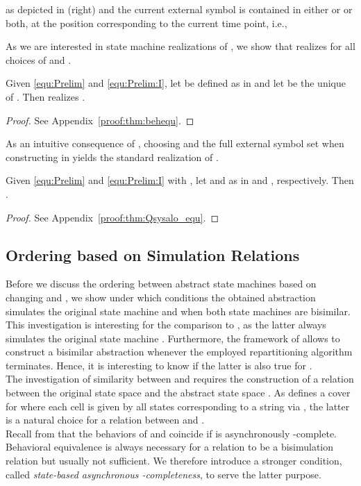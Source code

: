 as depicted in  (right) and the current external symbol  is contained in either  or  or both, at the position corresponding to the current time point, i.e.,

As we are interested in state machine realizations of \SAlA, we show that  realizes  for all choices of  and .

\begin{theorem}\label{thm:behequ}
Given \eqref{equ:Prelim} and \eqref{equ:Prelim:I}, let  be defined as in  and let  be the unique \SAlA of . Then  realizes .\end{theorem}
\begin{proof}
See Appendix~\ref{proof:thm:behequ}.
\end{proof}



As an intuitive consequence of , choosing  and the full external symbol set  when constructing  in  yields the standard realization  of \SAlA.

 \begin{theorem}\label{thm:Qsysalo_equ}
 Given \eqref{equ:Prelim} and \eqref{equ:Prelim:I} with , let  and  as in  and , respectively. Then .
 \end{theorem}
 
 \begin{proof}
 See Appendix~\ref{proof:thm:Qsysalo_equ}.
 \end{proof}
 


\subsection{Ordering  based on Simulation Relations}

Before we discuss the ordering between abstract state machines based on changing  and , we show under which conditions the obtained abstraction  simulates the original state machine  and when both state machines are bisimilar. This investigation is interesting for the comparison to \QBA, as the latter always simulates the original state machine . Furthermore, the framework of \QBA allows to construct a bisimilar abstraction whenever the employed repartitioning algorithm terminates. Hence, it is interesting to know if the latter is also true for \SAlA.\\
The investigation of similarity between  and  requires the construction of a relation between the original state space  and the abstract state space . As  defines a cover for  where each cell is given by all states  corresponding to a string  via , the latter is a natural choice for a relation between  and .\\
Recall from  that the behaviors of  and  coincide if  is asynchronously -complete. Behavioral equivalence is always necessary for a relation  to be a bisimulation relation but usually not sufficient. We therefore introduce a stronger condition, called \emph{state-based asynchronous -completeness}, to serve the latter purpose.

